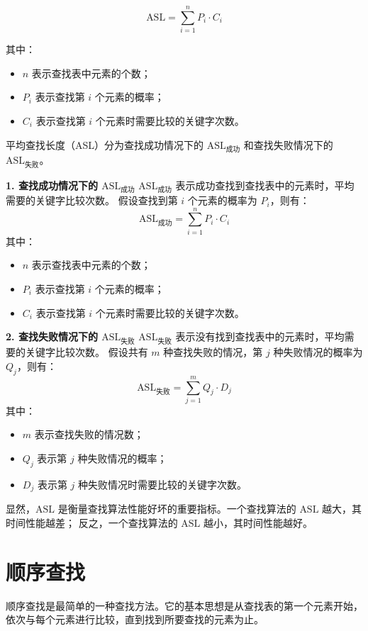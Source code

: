 \documentclass[lang=cn,newtx,10pt,scheme=chinese]{elegantbook}
\begin{document}
\[
\text{ASL} = \sum_{i=1}^n P_i \cdot C_i
\]

其中：
\begin{itemize}
  \item $n$ 表示查找表中元素的个数；
  \item $P_i$ 表示查找第 $i$ 个元素的概率；
  \item $C_i$ 表示查找第 $i$ 个元素时需要比较的关键字次数。
\end{itemize}

平均查找长度（ASL）分为查找成功情况下的 $\text{ASL}_{\text{成功}}$ 和查找失败情况下的 $\text{ASL}_{\text{失败}}$。

\textbf{1. 查找成功情况下的 $\text{ASL}_{\text{成功}}$}  
$\text{ASL}_{\text{成功}}$ 表示成功查找到查找表中的元素时，平均需要的关键字比较次数。  
假设查找到第 $i$ 个元素的概率为 $P_i$，则有：
\[
\text{ASL}_{\text{成功}} = \sum_{i=1}^n P_i \cdot C_i
\]
其中：
\begin{itemize}
  \item $n$ 表示查找表中元素的个数；
  \item $P_i$ 表示查找第 $i$ 个元素的概率；
  \item $C_i$ 表示查找第 $i$ 个元素时需要比较的关键字次数。
\end{itemize}

\textbf{2. 查找失败情况下的 $\text{ASL}_{\text{失败}}$}  
$\text{ASL}_{\text{失败}}$ 表示没有找到查找表中的元素时，平均需要的关键字比较次数。  
假设共有 $m$ 种查找失败的情况，第 $j$ 种失败情况的概率为 $Q_j$，则有：
\[
\text{ASL}_{\text{失败}} = \sum_{j=1}^m Q_j \cdot D_j
\]
其中：
\begin{itemize}
  \item $m$ 表示查找失败的情况数；
  \item $Q_j$ 表示第 $j$ 种失败情况的概率；
  \item $D_j$ 表示第 $j$ 种失败情况时需要比较的关键字次数。
\end{itemize}

显然，$\text{ASL}$ 是衡量查找算法性能好坏的重要指标。一个查找算法的 $\text{ASL}$ 越大，其时间性能越差；
反之，一个查找算法的 $\text{ASL}$ 越小，其时间性能越好。


\section{顺序查找}

顺序查找是最简单的一种查找方法。它的基本思想是从查找表的第一个元素开始，依次与每个元素进行比较，直到找到所要查找的元素为止。
\end{document}

